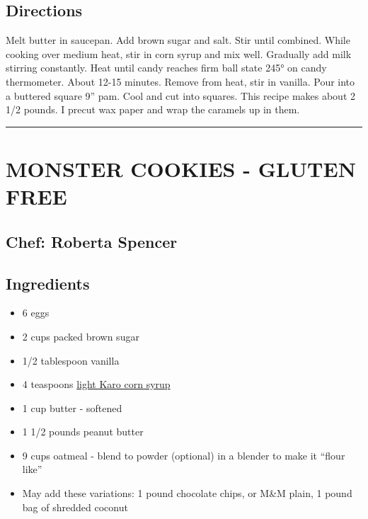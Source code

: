 \documentclass[
]{book}
\providecommand{\tightlist}{%
  \setlength{\itemsep}{0pt}\setlength{\parskip}{0pt}}
\begin{document}
\hypertarget{directions-101}{%
\subsection*{Directions}\label{directions-101}}


Melt butter in saucepan. Add brown sugar and salt. Stir until combined. While cooking over medium heat, stir in corn syrup and mix well. Gradually add milk stirring constantly. Heat until candy reaches firm ball state 245° on candy thermometer. About 12-15 minutes. Remove from heat, stir in vanilla. Pour into a buttered square 9'' pam. Cool and cut into squares. This recipe makes about 2 1/2 pounds. I precut wax paper and wrap the caramels up in them.

\begin{center}\rule{0.5\linewidth}{0.5pt}\end{center}

\hypertarget{monster-cookies---gluten-free}{%
\section*{MONSTER COOKIES - GLUTEN FREE}\label{monster-cookies---gluten-free}}


\hypertarget{chef-roberta-spencer-36}{%
\subsection*{Chef: Roberta Spencer}\label{chef-roberta-spencer-36}}


\hypertarget{ingredients-102}{%
\subsection*{Ingredients}\label{ingredients-102}}


\begin{itemize}
\tightlist
\item
  6 eggs
\item
  2 cups packed brown sugar
\item
  1/2 tablespoon vanilla
\item
  4 teaspoons \href{https://en.wikipedia.org/wiki/Corn_syrup}{light Karo corn syrup}
\item
  1 cup butter - softened
\item
  1 1/2 pounds peanut butter
\item
  9 cups oatmeal - blend to powder (optional) in a blender to make it ``flour like''
\item
  May add these variations: 1 pound chocolate chips, or M\&M plain, 1 pound bag of shredded coconut
\end{itemize}
\end{document}
